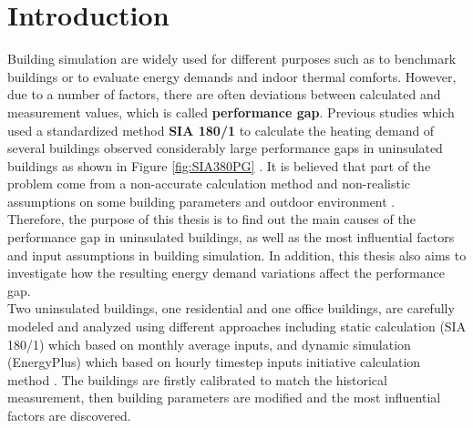\chapter{Introduction}\label{sec:introduction}
	
		Building simulation are widely used for different purposes such as to benchmark buildings or to evaluate energy demands and indoor thermal comforts. However, due to a number of factors, there are often deviations between calculated  and measurement values, which is called \textbf{performance gap}. Previous studies which used a standardized method \textbf{SIA 180/1} to calculate the heating demand of several buildings observed considerably large performance gaps in uninsulated buildings as shown in Figure \ref{fig:SIA380PG} \cite{SIAPreviousreport}. It is believed that part of the problem come from a non-accurate calculation method and non-realistic assumptions on some building parameters and outdoor environment \cite{SIAPreviousreport}. \\
	
	
		Therefore, the purpose of this thesis is to find out the main causes of the performance gap in uninsulated buildings, as well as the most influential factors and input assumptions in building simulation. In addition, this thesis also aims to investigate how the resulting energy demand variations affect the performance gap.\\

	
		Two uninsulated buildings, one residential and one office buildings, are carefully modeled and analyzed using different approaches including static calculation (SIA 180/1) which based on monthly average inputs, and dynamic simulation (EnergyPlus) which based on hourly timestep inputs initiative calculation method \cite{SIA2024Shop,SIAPreviousreport,crawley2000energy}. The buildings are firstly calibrated to match the historical measurement, then building parameters are modified and the most influential factors are discovered.\\

